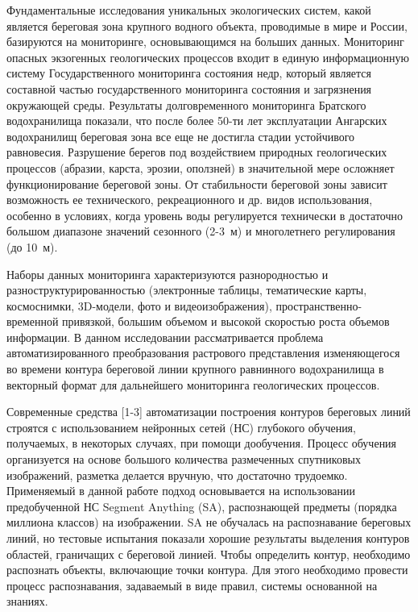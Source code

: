 Фундаментальные исследования уникальных экологических систем, какой является береговая зона крупного водного объекта, проводимые в мире и России, базируются на мониторинге, основывающимся на больших данных. Мониторинг опасных экзогенных геологических процессов входит в единую информационную систему Государственного мониторинга состояния недр, который является составной частью государственного мониторинга состояния и загрязнения окружающей среды. Результаты долговременного мониторинга Братского водохранилища показали, что после более 50-ти лет эксплуатации Ангарских водохранилищ береговая зона все еще не достигла стадии устойчивого равновесия. Разрушение берегов под воздействием природных геологических процессов (абразии, карста, эрозии, оползней) в значительной мере осложняет функционирование береговой зоны. От стабильности береговой зоны зависит возможность ее технического, рекреационного и др. видов использования, особенно в условиях, когда уровень воды регулируется технически в достаточно большом диапазоне значений сезонного (2-3~м) и многолетнего регулирования (до 10~м).

Наборы данных мониторинга характеризуются разнородностью и разноструктурированностью (электронные таблицы, тематические карты, космоснимки, 3D-модели, фото и видеоизображения), пространственно-временной привязкой, большим объемом и высокой скоростью роста объемов информации. В данном исследовании рассматривается проблема автоматизированного преобразования растрового представления изменяющегося во времени контура  береговой линии крупного равнинного водохранилища в векторный формат для дальнейшего мониторинга геологических
процессов.

Современные средства [1-3] автоматизации построения контуров береговых линий строятся с использованием нейронных сетей (НС) глубокого обучения, получаемых, в некоторых случаях, при помощи дообучения. Процесс обучения организуется на основе большого количества размеченных спутниковых изображений, разметка делается вручную, что достаточно трудоемко. Применяемый в данной работе подход основывается на использовании предобученной НС Segment Anything (SA), распознающей предметы (порядка миллиона классов) на изображении. SA не обучалась на распознавание береговых линий, но тестовые испытания показали хорошие результаты выделения контуров областей, граничащих с береговой линией. Чтобы определить контур, необходимо распознать объекты, включающие точки контура. Для этого необходимо провести процесс распознавания, задаваемый в виде правил, системы основанной на знаниях.

